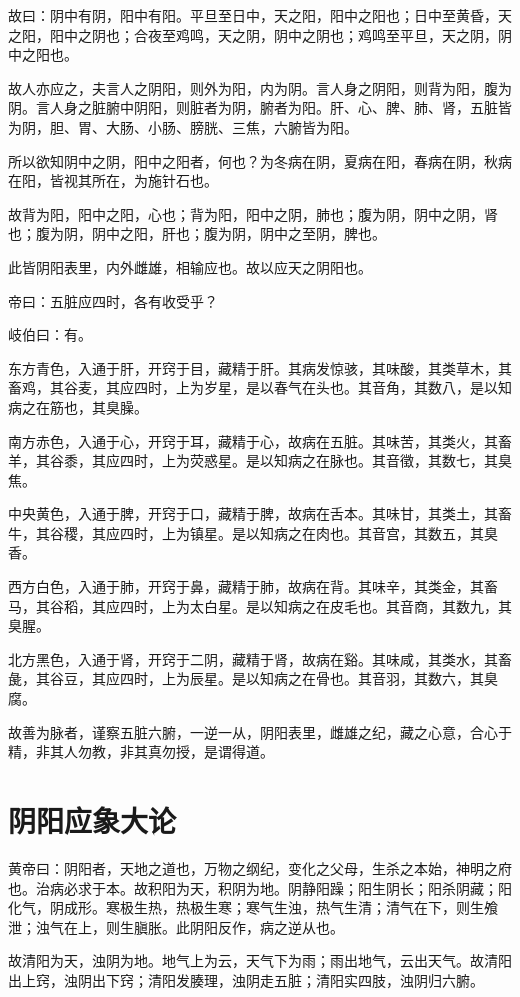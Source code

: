 \documentclass{article}%
\begin{document}
故曰：阴中有阴，阳中有阳。平旦至日中，天之阳，阳中之阳也；日中至黄昏，天之阳，阳中之阴也；合夜至鸡鸣，天之阴，阴中之阴也；鸡鸣至平旦，天之阴，阴中之阳也。

故人亦应之，夫言人之阴阳，则外为阳，内为阴。言人身之阴阳，则背为阳，腹为阴。言人身之脏腑中阴阳，则脏者为阴，腑者为阳。肝、心、脾、肺、肾，五脏皆为阴，胆、胃、大肠、小肠、膀胱、三焦，六腑皆为阳。

所以欲知阴中之阴，阳中之阳者，何也？为冬病在阴，夏病在阳，春病在阴，秋病在阳，皆视其所在，为施针石也。

故背为阳，阳中之阳，心也；背为阳，阳中之阴，肺也；腹为阴，阴中之阴，肾也；腹为阴，阴中之阳，肝也；腹为阴，阴中之至阴，脾也。

此皆阴阳表里，内外雌雄，相输应也。故以应天之阴阳也。

帝曰：五脏应四时，各有收受乎？

岐伯曰：有。

东方青色，入通于肝，开窍于目，藏精于肝。其病发惊骇，其味酸，其类草木，其畜鸡，其谷麦，其应四时，上为岁星，是以春气在头也。其音角，其数八，是以知病之在筋也，其臭臊。

南方赤色，入通于心，开窍于耳，藏精于心，故病在五脏。其味苦，其类火，其畜羊，其谷黍，其应四时，上为荧惑星。是以知病之在脉也。其音徵，其数七，其臭焦。

中央黄色，入通于脾，开窍于口，藏精于脾，故病在舌本。其味甘，其类土，其畜牛，其谷稷，其应四时，上为镇星。是以知病之在肉也。其音宫，其数五，其臭香。

西方白色，入通于肺，开窍于鼻，藏精于肺，故病在背。其味辛，其类金，其畜马，其谷稻，其应四时，上为太白星。是以知病之在皮毛也。其音商，其数九，其臭腥。

北方黑色，入通于肾，开窍于二阴，藏精于肾，故病在谿。其味咸，其类水，其畜彘，其谷豆，其应四时，上为辰星。是以知病之在骨也。其音羽，其数六，其臭腐。

故善为脉者，谨察五脏六腑，一逆一从，阴阳表里，雌雄之纪，藏之心意，合心于精，非其人勿教，非其真勿授，是谓得道。
\section{阴阳应象大论}
黄帝曰：阴阳者，天地之道也，万物之纲纪，变化之父母，生杀之本始，神明之府也。治病必求于本。故积阳为天，积阴为地。阴静阳躁；阳生阴长；阳杀阴藏；阳化气，阴成形。寒极生热，热极生寒；寒气生浊，热气生清；清气在下，则生飧泄；浊气在上，则生䐜胀。此阴阳反作，病之逆从也。

故清阳为天，浊阴为地。地气上为云，天气下为雨；雨出地气，云出天气。故清阳出上窍，浊阴出下窍；清阳发腠理，浊阴走五脏；清阳实四肢，浊阴归六腑。
\end{document}
